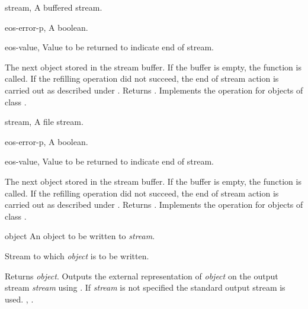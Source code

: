 \begin{optDefinition}
\begin{specargs}
    \item[stream, \classref{buffered-stream}] A buffered stream.
    \item[eos-error-p, \classref{object}] A boolean.
    \item[eos-value, \classref{object}] Value to be returned to indicate end of
    stream.
\end{specargs}
%
\result%
The next object stored in the stream buffer.  If the buffer is empty,
the function  is called. If the refilling operation did
not succeed, the end of stream action is carried out as described under
.  Returns \true.
%
\remarks%
Implements the  operation for objects of class
.

\begin{specargs}
    \item[stream, \classref{file-stream}] A file stream.
    \item[eos-error-p, \classref{object}] A boolean.
    \item[eos-value, \classref{object}] Value to be returned to indicate end of
    stream.
\end{specargs}
%
\result%
The next object stored in the stream buffer.  If the buffer is empty,
the function  is called. If the refilling operation did
not succeed, the end of stream action is carried out as described under
.  Returns \true.
%
\remarks%
Implements the  operation for objects of class
.


\begin{arguments}
    \item[object] An object to be written to {\em stream}.
    \item[\optional{stream}] Stream to which {\em object\/} is
    to be written.
\end{arguments}
%
\result%
Returns {\em object}.
%
\remarks%
Outputs the external representation of {\em object\/} on the output
stream {\em stream\/} using .  If {\em stream\/} is
not specified the standard output stream is used.
%
\seealso%
, .


\end{optDefinition}

